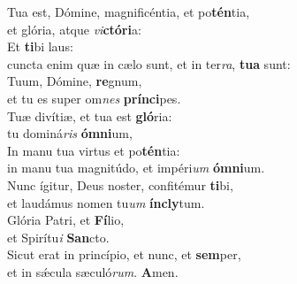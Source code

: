 \evenverse Tua est, Dómine, magnificéntia, et po\textbf{tén}tia,~\*\\
\evenverse et glória, atque \textit{vi}\textbf{ctó}\textbf{ri}a:\\
\oddverse Et \textbf{ti}bi laus:~\*\\
\oddverse cuncta enim quæ in cælo sunt, et in ter\textit{ra}, \textbf{tu}\textbf{a} sunt:\\
\evenverse Tuum, Dómine, \textbf{re}gnum,~\*\\
\evenverse et tu es super om\textit{nes} \textbf{prín}\textbf{ci}pes.\\
\oddverse Tuæ divítiæ, et tua est \textbf{gló}ria:~\*\\
\oddverse tu dominá\textit{ris} \textbf{óm}\textbf{ni}um,\\
\evenverse In manu tua virtus et po\textbf{tén}tia:~\*\\
\evenverse in manu tua magnitúdo, et impéri\textit{um} \textbf{óm}\textbf{ni}um.\\
\oddverse Nunc ígitur, Deus noster, confitémur \textbf{ti}bi,~\*\\
\oddverse et laudámus nomen tu\textit{um} \textbf{ín}\textbf{cly}tum.\\
\evenverse Glória Patri, et \textbf{Fí}lio,~\*\\
\evenverse et Spirítu\textit{i} \textbf{San}cto.\\
\oddverse Sicut erat in princípio, et nunc, et \textbf{sem}per,~\*\\
\oddverse et in sǽcula sæculó\textit{rum}. \textbf{A}men.\\
